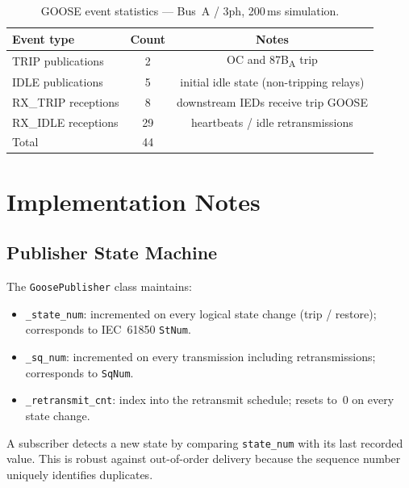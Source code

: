 \documentclass[12pt,a4paper]{article}
\begin{document}
\begin{table}[H]
  \centering
  \caption{GOOSE event statistics — Bus~A / 3ph, 200\,ms simulation.}
  \label{tab:goose_events}
  \begin{tabular}{lcc}
    \toprule
    Event type & Count & Notes \\
    \midrule
    TRIP publications      &  2 & OC and 87B\textsubscript{A} trip \\
    IDLE publications      &  5 & initial idle state (non-tripping relays) \\
    RX\_TRIP receptions    &  8 & downstream IEDs receive trip GOOSE \\
    RX\_IDLE receptions    & 29 & heartbeats / idle retransmissions \\
    \midrule
    Total                  & 44 & \\
    \bottomrule
  \end{tabular}
\end{table}

\section{Implementation Notes}
\label{sec:impl}

\subsection{Publisher State Machine}

The \texttt{GoosePublisher} class maintains:
\begin{itemize}
  \item \texttt{\_state\_num}: incremented on every logical state change
    (trip / restore); corresponds to IEC~61850 \texttt{StNum}.
  \item \texttt{\_sq\_num}: incremented on every transmission including
    retransmissions; corresponds to \texttt{SqNum}.
  \item \texttt{\_retransmit\_cnt}: index into the retransmit schedule;
    resets to~0 on every state change.
\end{itemize}

A subscriber detects a new state by comparing \texttt{state\_num} with
its last recorded value.  This is robust against out-of-order delivery
because the sequence number uniquely identifies duplicates.
\end{document}
